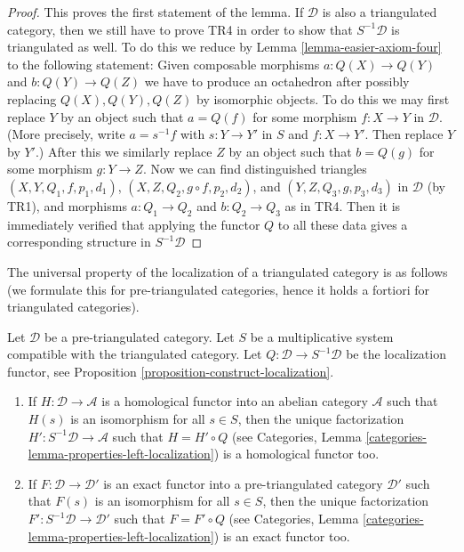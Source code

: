 \begin{proof}
\medskip\noindent
This proves the first statement of the lemma. If $\mathcal{D}$ is also
a triangulated category, then we still have to prove TR4 in order to show
that $S^{-1}\mathcal{D}$ is triangulated as well. To do this we reduce by
Lemma \ref{lemma-easier-axiom-four}
to the following statement: Given composable morphisms
$a : Q(X) \to Q(Y)$ and $b : Q(Y) \to Q(Z)$ we have to produce
an octahedron after possibly replacing $Q(X), Q(Y), Q(Z)$ by isomorphic
objects. To do this we may first replace $Y$ by an object such that
$a = Q(f)$ for some morphism $f : X \to Y$ in $\mathcal{D}$. (More precisely,
write $a = s^{-1}f$ with $s : Y \to Y'$ in $S$ and $f : X \to Y'$. Then
replace $Y$ by $Y'$.) After this we similarly replace $Z$ by an object such
that $b = Q(g)$ for some morphism $g : Y \to Z$. Now we can find
distinguished triangles $(X, Y, Q_1, f, p_1, d_1)$,
$(X, Z, Q_2, g \circ f, p_2, d_2)$, and
$(Y, Z, Q_3, g, p_3, d_3)$ in $\mathcal{D}$ (by TR1), and
morphisms $a : Q_1 \to Q_2$ and $b : Q_2 \to Q_3$ as in TR4.
Then it is immediately verified that applying the functor $Q$ to
all these data gives a corresponding structure in $S^{-1}\mathcal{D}$
\end{proof}

\noindent
The universal property of the localization of a triangulated category
is as follows (we formulate this for pre-triangulated categories, hence
it holds a fortiori for triangulated categories).

\begin{lemma}
\label{lemma-universal-property-localization}
Let $\mathcal{D}$ be a pre-triangulated category. Let $S$ be a multiplicative
system compatible with the triangulated category. Let
$Q : \mathcal{D} \to S^{-1}\mathcal{D}$ be the localization functor, see
Proposition \ref{proposition-construct-localization}.
\begin{enumerate}
\item If $H : \mathcal{D} \to \mathcal{A}$ is a homological functor into
an abelian category $\mathcal{A}$ such that $H(s)$ is an isomorphism for
all $s \in S$, then the unique factorization
$H' : S^{-1}\mathcal{D} \to \mathcal{A}$ such that $H = H' \circ Q$ (see
Categories, Lemma \ref{categories-lemma-properties-left-localization})
is a homological functor too.
\item If $F : \mathcal{D} \to \mathcal{D}'$ is an exact functor into
a pre-triangulated category $\mathcal{D}'$ such that $F(s)$ is an isomorphism
for all $s \in S$, then the unique factorization
$F' : S^{-1}\mathcal{D} \to \mathcal{D}'$ such that $F = F' \circ Q$ (see
Categories, Lemma \ref{categories-lemma-properties-left-localization})
is an exact functor too.
\end{enumerate}
\end{lemma}

